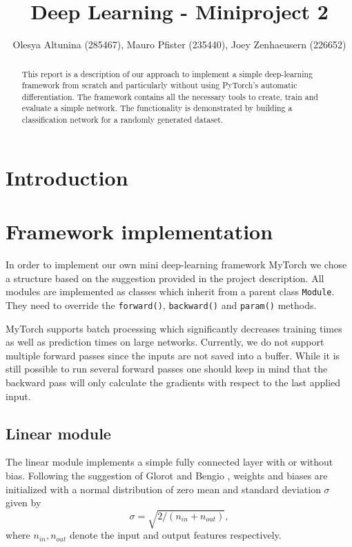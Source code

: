 \documentclass[10pt,conference,compsocconf]{IEEEtran}
\begin{document}
\title{Deep Learning - Miniproject 2}

\author{
  Olesya Altunina (285467), Mauro Pfister (235440), Joey Zenhaeusern (226652)
}

\maketitle

\begin{abstract}
This report is a description of our approach to implement a simple deep-learning framework from scratch and particularly without using PyTorch's automatic differentiation. The framework contains all the necessary tools to create, train and evaluate a simple network. The functionality is demonstrated by building a classification network for a randomly generated dataset. 
\end{abstract}

\section{Introduction}

\section{Framework implementation}
In order to implement our own mini deep-learning framework MyTorch we chose a structure based on the suggestion provided in the project description. All modules are implemented as classes which inherit from a parent class \texttt{Module}. They need to override the \texttt{forward()}, \texttt{backward()} and \texttt{param()} methods.

MyTorch supports batch processing which significantly decreases training times as well as prediction times on large networks. Currently, we do not support multiple forward passes since the inputs are not saved into a buffer. While it is still possible to run several forward passes one should keep in mind that the backward pass will only calculate the gradients with respect to the last applied input.

\subsection{Linear module}
The linear module implements a simple fully connected layer with or without bias. Following the suggestion of Glorot and Bengio \cite{pmlr-v9-glorot10a}, weights and biases are initialized with a normal distribution of zero mean and standard deviation $\sigma$ given by
\begin{equation} \label{eq:Winit}
  \sigma = \sqrt{2 / (n_{in} + n_{out})},
\end{equation}
where $n_{in}, n_{out}$ denote the input and output features respectively.\\
\end{document}
